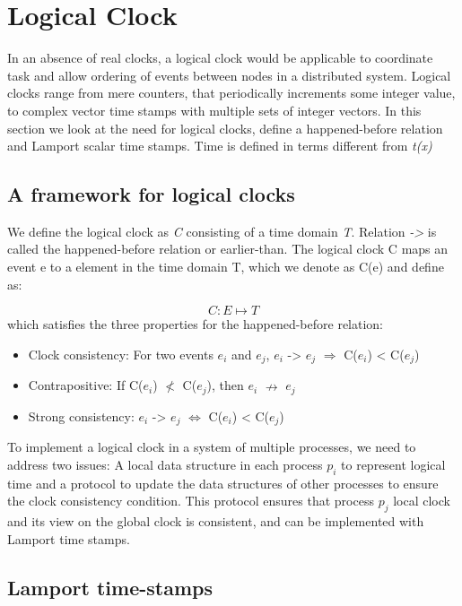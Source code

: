 \section{Logical Clock}\label{sc:logicalClock}

In an absence of real clocks, a logical clock would be applicable to coordinate task and allow ordering of events between nodes in a distributed system. Logical clocks range from mere counters, that periodically increments some integer value, to complex vector time stamps with multiple sets of integer vectors. In this section we look at the need for logical clocks, define a happened-before relation and Lamport scalar time stamps. Time is defined in terms different from \textit{t(x)}

\subsection{A framework for logical clocks}

We define the logical clock as \textit{C} consisting of a time domain \textit{T}. Relation \textit{->} is called the happened-before relation or earlier-than. The logical clock C maps an event e to a element in the time domain T, which we denote as C(e) and define as:

\[ C: E \longmapsto T \]
which satisfies the three properties for the happened-before relation:

\begin{itemize}
	\item Clock consistency: For two events $e_i$ and $e_j$, $e_i$ -> $e_j$ $\Longrightarrow$ C($e_i$) < C($e_j$)
	\item Contrapositive: If C($e_i$) $\nless$ C($e_j$), then $e_i$ $\nrightarrow$ $e_j$
	\item Strong consistency: $e_i$ -> $e_j$ $\Leftrightarrow$ C($e_i$) < C($e_j$)
\end{itemize}

To implement a logical clock in a system of multiple processes, we need to address two issues: A local data structure in each process $p_i$ to represent logical time and a protocol to update the data structures of other processes to ensure the clock consistency condition. This protocol ensures that process $p_j$ local clock and its view on the global clock is consistent, and can be implemented with Lamport time stamps. 

\subsection{Lamport time-stamps}

